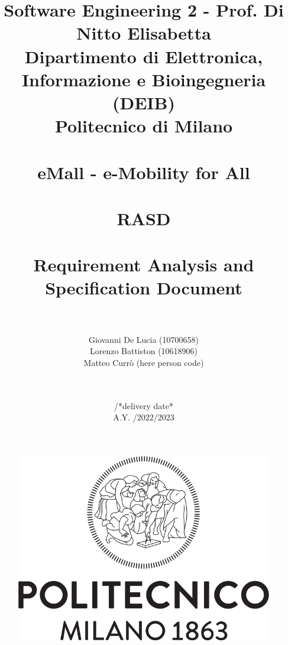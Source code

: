 \documentclass{article}
\title{
  {\small Software Engineering 2 - Prof. Di Nitto Elisabetta \\
  Dipartimento di Elettronica, Informazione e Bioingegneria (DEIB) \\ Politecnico di Milano} \\ \hfill \\
  \textbf{eMall - e-Mobility for All} \\ \hfill \\
  \large RASD \\ \hfill \\
    Requirement Analysis and Specification Document \\ \hfill \\}
\author{Giovanni De Lucia (10700658) \\ Lorenzo Battiston (10618906) \\  Matteo Currò (here person code) \\ \hfill \\}
\date{\hfill \\ /*delivery date* \\ A.Y. /2022/2023}
\begin{document}
\maketitle

\begin{figure}[h]
  \centering
  \includegraphics[scale=0.2]{src/Logo_Politecnico_Milano.png}
\end{figure}

\pagebreak

\tableofcontents







\end{document}
